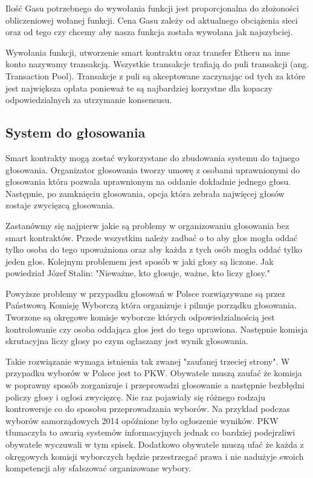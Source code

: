 \documentclass[]{llncs}
\begin{document}
  Ilość Gasu potrzebnego do wywołania funkcji jest proporcjonalna do złożoności
  obliczeniowej wołanej funkcji. Cena Gasu zależy od aktualnego obciążenia sieci
  oraz od tego czy chcemy aby nasza funkcja została wywołana jak najszybciej.

  Wywołania funkcji, utworzenie smart kontraktu oraz transfer Etheru na inne
  konto nazywamy transakcją. Wszystkie transakcje trafiają do puli transakcji
  (ang.  Transaction Pool). Transakcje z puli są akceptowane zaczynając od tych
  za które jest największa opłata ponieważ te są najbardziej korzystne dla
  kopaczy odpowiedzialnych za utrzymanie konsensusu.

\subsection{System do głosowania}

  Smart kontrakty mogą zostać wykorzystane do zbudowania systemu do tajnego
  głosowania. Organizator głosowania tworzy umowę z osobami uprawnionymi do
  głosowania która pozwala uprawnionym na oddanie dokładnie jednego głosu.
  Następnie, po zamknięciu głosowania, opcja która zebrała najwięcej głosów
  zostaje zwycięzcą głosowania.

  Zastanówmy się najpierw jakie są problemy w organizowaniu głosowania bez smart
  kontraktów. Przede wszystkim należy zadbać o to aby głos mogła oddać tylko
  osoba do tego upoważniona oraz aby każda z tych osób mogła oddać tylko jeden
  głos. Kolejnym problemem jest sposób w jaki głosy są liczone. Jak powiedział
  Józef Stalin: "Nieważne, kto głosuje, ważne, kto liczy głosy."

  Powyższe problemy w przypadku głosowań w Polsce rozwiązywane są przez
  Państwową Komisję Wyborczą która organizuje i pilnuje porządku głosowania.
  Tworzone są okręgowe komisje wyborcze których odpowiedzialnością jest
  kontrolowanie czy osoba oddająca głos jest do tego uprawiona. Następnie
  komisja skrutacyjna liczy głosy po czym ogłaszany jest wynik głosowania.

  Takie rozwiązanie wymaga istnienia tak zwanej "zaufanej trzeciej strony". W
  przypadku wyborów w Polsce jest to PKW. Obywatele muszą zaufać że komisja w
  poprawny sposób zorganizuje i przeprowadzi głosowanie a następnie bezbłędni
  policzy głosy i ogłosi zwycięzcę.  Nie raz pojawiały się różnego rodzaju
  kontrowersje co do sposobu przeprowadzania wyborów. Na przykład podczas
  wyborów samorządowych 2014 opóźnione było ogłoszenie wyników.  PKW tłumaczyła
  to awarią systemów informacyjnych jednak co bardziej podejrzliwi obywatele
  wyczuwali w tym spisek. Dodatkowo obywatele muszą ufać że każda z okręgowych
  komisji wyborczych będzie przestrzegać prawa i nie nadużyje swoich kompetencji
  aby sfałszować organizowane wybory.
\end{document}
